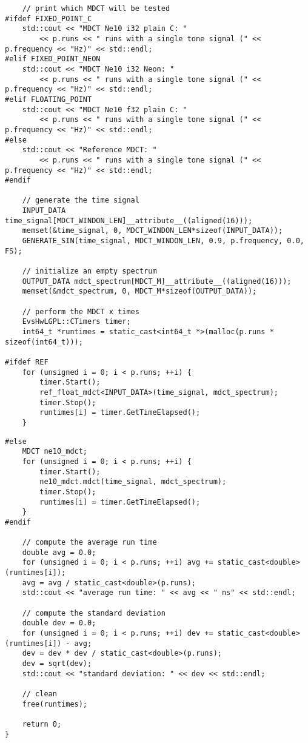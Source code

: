 \documentclass{article}
\begin{document}
\begin{lstlisting}
    // print which MDCT will be tested
#ifdef FIXED_POINT_C
    std::cout << "MDCT Ne10 i32 plain C: "
        << p.runs << " runs with a single tone signal (" << p.frequency << "Hz)" << std::endl;
#elif FIXED_POINT_NEON
    std::cout << "MDCT Ne10 i32 Neon: "
        << p.runs << " runs with a single tone signal (" << p.frequency << "Hz)" << std::endl;
#elif FLOATING_POINT
    std::cout << "MDCT Ne10 f32 plain C: "
        << p.runs << " runs with a single tone signal (" << p.frequency << "Hz)" << std::endl;
#else
    std::cout << "Reference MDCT: "
        << p.runs << " runs with a single tone signal (" << p.frequency << "Hz)" << std::endl;
#endif

    // generate the time signal
    INPUT_DATA time_signal[MDCT_WINDON_LEN]__attribute__((aligned(16)));
    memset(&time_signal, 0, MDCT_WINDON_LEN*sizeof(INPUT_DATA));
    GENERATE_SIN(time_signal, MDCT_WINDON_LEN, 0.9, p.frequency, 0.0, FS);

    // initialize an empty spectrum
    OUTPUT_DATA mdct_spectrum[MDCT_M]__attribute__((aligned(16)));
    memset(&mdct_spectrum, 0, MDCT_M*sizeof(OUTPUT_DATA));

    // perform the MDCT x times
    EvsHwLGPL::CTimers timer;
    int64_t *runtimes = static_cast<int64_t *>(malloc(p.runs * sizeof(int64_t)));

#ifdef REF
    for (unsigned i = 0; i < p.runs; ++i) {
        timer.Start();
        ref_float_mdct<INPUT_DATA>(time_signal, mdct_spectrum);
        timer.Stop();
        runtimes[i] = timer.GetTimeElapsed();
    }
\end{lstlisting}
\newpage
\begin{lstlisting}
#else
    MDCT ne10_mdct;
    for (unsigned i = 0; i < p.runs; ++i) {
        timer.Start();
        ne10_mdct.mdct(time_signal, mdct_spectrum);
        timer.Stop();
        runtimes[i] = timer.GetTimeElapsed();
    }
#endif

    // compute the average run time
    double avg = 0.0;
    for (unsigned i = 0; i < p.runs; ++i) avg += static_cast<double>(runtimes[i]);
    avg = avg / static_cast<double>(p.runs);
    std::cout << "average run time: " << avg << " ns" << std::endl;

    // compute the standard deviation
    double dev = 0.0;
    for (unsigned i = 0; i < p.runs; ++i) dev += static_cast<double>(runtimes[i]) - avg;
    dev = dev * dev / static_cast<double>(p.runs);
    dev = sqrt(dev);
    std::cout << "standard deviation: " << dev << std::endl;

    // clean
    free(runtimes);

    return 0;
}
\end{lstlisting}
\end{document}
